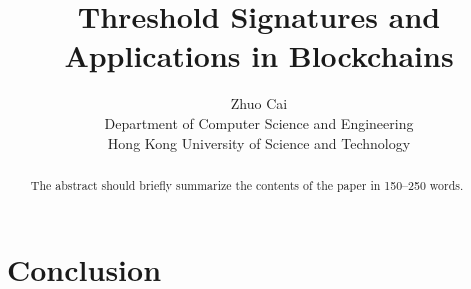 \documentclass[11pt]{article}
\newtheorem{theorem}{Theorem}[section]
\begin{document}
%
\title{Threshold Signatures and Applications in Blockchains}
%
%
\author{Zhuo Cai\\Department of Computer Science and Engineering\\Hong Kong University of Science and Technology}
%
%
%
\maketitle              %
%
\begin{abstract}
The abstract should briefly summarize the contents of the paper in
150--250 words.
\end{abstract}
%
%
\newpage
\tableofcontents

\newpage


\newpage


\newpage


\newpage


\newpage


\newpage


\newpage


\newpage


\newpage
\section{Conclusion}




\newpage



\end{document}
